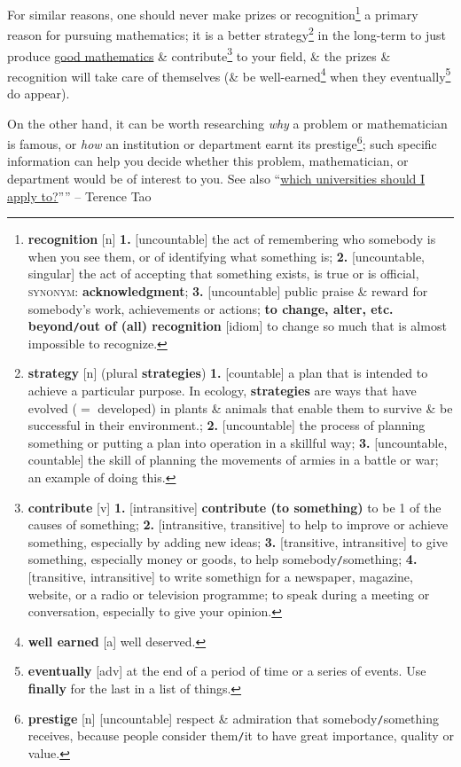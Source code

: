 \documentclass{article}
\numberwithin{equation}{section}
\begin{document}
For similar reasons, one should never make prizes or recognition\footnote{\textbf{recognition} [n] \textbf{1.} [uncountable] the act of remembering who somebody is when you see them, or of identifying what something is; \textbf{2.} [uncountable, singular] the act of accepting that something exists, is true or is official, \textsc{synonym}: \textbf{acknowledgment}; \textbf{3.} [uncountable] public praise \& reward for somebody's work, achievements or actions; \textbf{to change, alter, etc. beyond\texttt{/}out of (all) recognition} [idiom] to change so much that is almost impossible to recognize.} a primary reason for pursuing mathematics; it is a better strategy\footnote{\textbf{strategy} [n] (plural \textbf{strategies}) \textbf{1.} [countable] a plan that is intended to achieve a particular purpose. In ecology, \textbf{strategies} are ways that have evolved ($=$ developed) in plants \& animals that enable them to survive \& be successful in their environment.; \textbf{2.} [uncountable] the process of planning something or putting a plan into operation in a skillful way; \textbf{3.} [uncountable, countable] the skill of planning the movements of armies in a battle or war; an example of doing this.} in the long-term to just produce \href{http://arxiv.org/abs/math.HO/0702396}{good mathematics} \& contribute\footnote{\textbf{contribute} [v] \textbf{1.} [intransitive] \textbf{contribute (to something)} to be 1 of the causes of something; \textbf{2.} [intransitive, transitive] to help to improve or achieve something, especially by adding new ideas; \textbf{3.} [transitive, intransitive] to give something, especially money or goods, to help somebody\texttt{/}something; \textbf{4.} [transitive, intransitive] to write somethign for a newspaper, magazine, website, or a radio or television programme; to speak during a meeting or conversation, especially to give your opinion.} to your field, \& the prizes \& recognition will take care of themselves (\& be well-earned\footnote{\textbf{well earned} [a] well deserved.} when they eventually\footnote{\textbf{eventually} [adv] at the end of a period of time or a series of events. Use \textbf{finally} for the last in a list of things.} do appear).

On the other hand, it can be worth researching \textit{why} a problem or mathematician is famous, or \textit{how} an institution or department earnt its prestige\footnote{\textbf{prestige} [n] [uncountable] respect \& admiration that somebody\texttt{/}something receives, because people consider them\texttt{/}it to have great importance, quality or value.}; such specific information can help you decide whether this problem, mathematician, or department would be of interest to you. See also ``\href{https://terrytao.wordpress.com/career-advice/which-universities-should-one-apply-to/}{which universities should I apply to?}'''' -- Terence Tao
\end{document}
